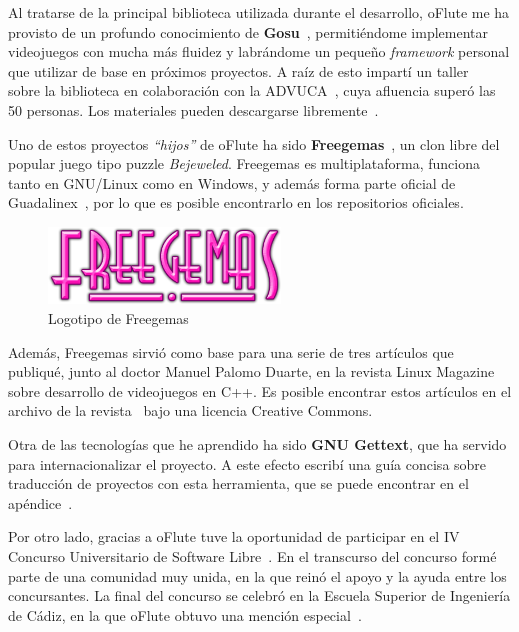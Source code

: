Al tratarse de la principal biblioteca utilizada durante el desarrollo, oFlute
me ha provisto de un profundo conocimiento de \textbf{Gosu}~\cite{gosu},
permitiéndome implementar videojuegos con mucha más fluidez y labrándome un
pequeño \textit{framework} personal que utilizar de base en próximos
proyectos. A raíz de esto impartí un taller~\cite{tallergosu} sobre la
biblioteca en colaboración con la ADVUCA~\cite{advuca}, cuya
afluencia superó las 50 personas. Los materiales pueden descargarse
libremente~\cite{tallergosumateriales}.

Uno de estos proyectos \textit{``hijos''} de oFlute ha sido
\textbf{Freegemas}~\cite{freegemas}, un clon libre del popular juego tipo puzzle
\textit{Bejeweled}. Freegemas es multiplataforma, funciona tanto en GNU/Linux
como en Windows, y además forma parte oficial de Guadalinex~\cite{guadalinex},
por lo que es posible encontrarlo en los repositorios oficiales. 

\begin{figure}[h!]
  \centering
  \includegraphics[width=0.55\textwidth]{8_conclusiones/imagen_freegemas}
  \caption{Logotipo de Freegemas}
\end{figure}

Además, Freegemas sirvió como base para una serie de tres artículos que
publiqué, junto al doctor Manuel Palomo Duarte, en la revista Linux
Magazine~\cite{linuxmagazine} sobre desarrollo de videojuegos en C++. Es posible
encontrar estos artículos en el archivo de la
revista~\cite{refarticulo1}\cite{refarticulo2}\cite{refarticulo3} bajo una
licencia Creative Commons.

Otra de las tecnologías que he aprendido ha sido \textbf{GNU Gettext}, que ha
servido para internacionalizar el proyecto. A este efecto escribí una guía
concisa sobre traducción de proyectos con esta herramienta, que se puede
encontrar en el apéndice~\textit{}.

Por otro lado, gracias a oFlute tuve la oportunidad de participar en el IV
Concurso Universitario de Software Libre~\cite{cusl}. En el transcurso del
concurso formé parte de una comunidad muy unida, en la que reinó el apoyo y la
ayuda entre los concursantes. La final del concurso se celebró en la Escuela
Superior de Ingeniería de Cádiz, en la que oFlute obtuvo una mención
especial~\cite{cusl2}.

